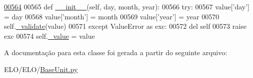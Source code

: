 \begin{DoxyCode}
\hypertarget{classELO_1_1BaseUnit_1_1Date_l00564}{}\hyperlink{classELO_1_1BaseUnit_1_1Date_a97d924fa5f1b2a1d8afbdbfe17b6a852}{00564} 
00565     \textcolor{keyword}{def }\hyperlink{classELO_1_1BaseUnit_1_1Date_a97d924fa5f1b2a1d8afbdbfe17b6a852}{\_\_init\_\_}(self, day, month, year):
00566         \textcolor{keywordflow}{try}:
00567             value[\textcolor{stringliteral}{'day'}] = day
00568             value[\textcolor{stringliteral}{'month'}] = month
00569             value[\textcolor{stringliteral}{'year'}] = year
00570             self.\hyperlink{classELO_1_1BaseUnit_1_1IfBaseType_a11c68b128a7069e27c1c2fcb782269ea}{\_validate}(value)
00571         \textcolor{keywordflow}{except} ValueError \textcolor{keyword}{as} exc:
00572             del self
00573             \textcolor{keywordflow}{raise} exc
00574         self.\hyperlink{classELO_1_1BaseUnit_1_1IfBaseType_ad05d9d377fc4b99743c022cc8f6019d7}{\_value} = value

\end{DoxyCode}


A documentação para esta classe foi gerada a partir do seguinte arquivo\-:\begin{DoxyCompactItemize}
\item 
E\-L\-O/\-E\-L\-O/\hyperlink{BaseUnit_8py}{Base\-Unit.\-py}\end{DoxyCompactItemize}
